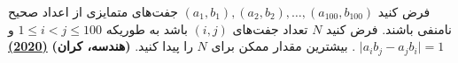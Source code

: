 فرض کنید $(a_1, b_1), (a_2, b_2), \dots, (a_{100}, b_{100})$ جفت‌های متمایزی از اعداد صحیح نامنفی باشند.
فرض کنید $N$ تعداد جفت‌های $(i, j)$ باشد به طوریکه $1 \le i < j \le 100$ و $\big| a_i b_j - a_j b_i \big| = 1$
. بیشترین مقدار ممکن برای $N$ را پیدا کنید.
\textbf{(هندسه، کران)}
\href{https://artofproblemsolving.com/community/c5h2156986p15952792}{\textbf{(2020)}}